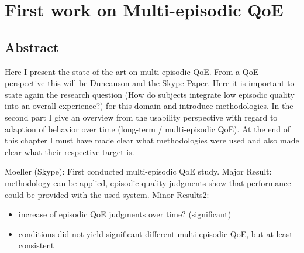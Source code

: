 \chapter{First work on Multi-episodic QoE}\label{chap:05} %
\section*{Abstract}

Here I present the state-of-the-art on multi-episodic QoE.
From a QoE perspective this will be Duncanson and the Skype-Paper.
Here it is important to state again the research question (How do subjects integrate low episodic quality into an overall experience?) for this domain and introduce methodologies.
In the second part I give an overview from the usability perspective with regard to adaption of behavior over time (long-term / multi-episodic QoE).
At the end of this chapter I must have made clear what methodologies were used and also made clear what their respective target is.



Moeller (Skype): First conducted multi-episodic QoE study.
Major Result: methodology can be applied, episodic quality judgments show that performance could be provided with the used system.
Minor Results2: 
\begin{itemize}
\item increase of episodic QoE judgments over time? (significant)
\item conditions did not yield significant different multi-episodic QoE, but at least consistent
\end{itemize}


